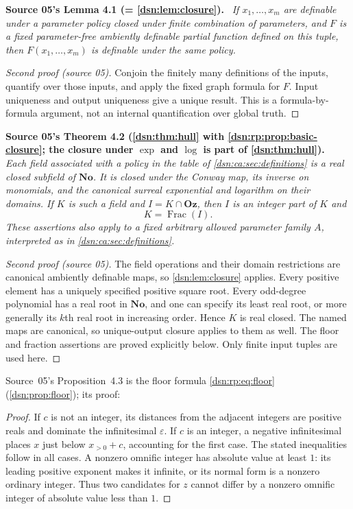 \documentclass[11pt,a4paper]{article}
\numberwithin{equation}{section}
\theoremstyle{definition}
\theoremstyle{remark}
\newcommand{\No}{\mathbf{No}}
\newcommand{\Oz}{\mathbf{Oz}}
\newcommand{\Frac}{\operatorname{Frac}}
\newenvironment{dupstatement}[1]{\par\medskip\noindent\textbf{#1.}\ \begingroup\itshape\ignorespaces}{\endgroup\par\medskip}
\begin{document}
\begin{dupstatement}{Source 05's Lemma 4.1 (= \cref{dsn:lem:closure})}
If $x_1,\ldots,x_m$ are definable under a parameter policy closed under
finite combination of parameters, and $F$ is a fixed parameter-free
ambiently definable partial function defined on this tuple, then
$F(x_1,\ldots,x_m)$ is definable under the same policy.
\end{dupstatement}
\begin{proof}[Second proof (source 05)]
Conjoin the finitely many definitions of the inputs, quantify over those
inputs, and apply the fixed graph formula for $F$. Input uniqueness and
output uniqueness give a unique result. This is a formula-by-formula
argument, not an internal quantification over global truth.
\end{proof}
\begin{dupstatement}{Source 05's Theorem 4.2 (\cref{dsn:thm:hull} with \cref{dsn:rp:prop:basic-closure}; the closure under $\exp$ and $\log$ is part of \cref{dsn:thm:hull})}
Each field associated with a policy in the table of
\cref{dsn:ca:sec:definitions} is a real closed subfield of $\No$. It is closed
under the Conway map, its inverse on monomials, and the canonical surreal
exponential and logarithm on their domains. If $K$ is such a field and
$I=K\cap\Oz$, then $I$ is an integer part of $K$ and
\begin{equation}\label{dsn:ca:eq:frac}
 K=\Frac(I).
\end{equation}
These assertions also apply to a fixed arbitrary allowed parameter
family $A$, interpreted as in \cref{dsn:ca:sec:definitions}.
\end{dupstatement}
\begin{proof}[Second proof (source 05)]
The field operations and their domain restrictions are canonical
ambiently definable maps, so \cref{dsn:lem:closure} applies. Every positive
element has a uniquely specified positive square root. Every odd-degree
polynomial has a real root in $\No$, and one can specify its least real
root, or more generally its $k$th real root in increasing order. Hence
$K$ is real closed. The named maps are canonical, so unique-output
closure applies to them as well. The floor and fraction assertions are
proved explicitly below. Only finite input tuples are used here.
\end{proof}
Source~05's Proposition~4.3 is the floor formula \eqref{dsn:rp:eq:floor}
(\cref{dsn:prop:floor}); its proof:
\begin{proof}
If $c$ is not an integer, its distances from the adjacent integers are
positive reals and dominate the infinitesimal $\varepsilon$. If $c$ is
an integer, a negative infinitesimal places $x$ just below
$x_{>0}+c$, accounting for the first case. The stated inequalities follow
in all cases. A nonzero omnific integer has absolute value at least $1$:
its leading positive exponent makes it infinite, or its normal form is
a nonzero ordinary integer. Thus two candidates for $z$ cannot differ
by a nonzero omnific integer of absolute value less than $1$.
\end{proof}
\end{document}
